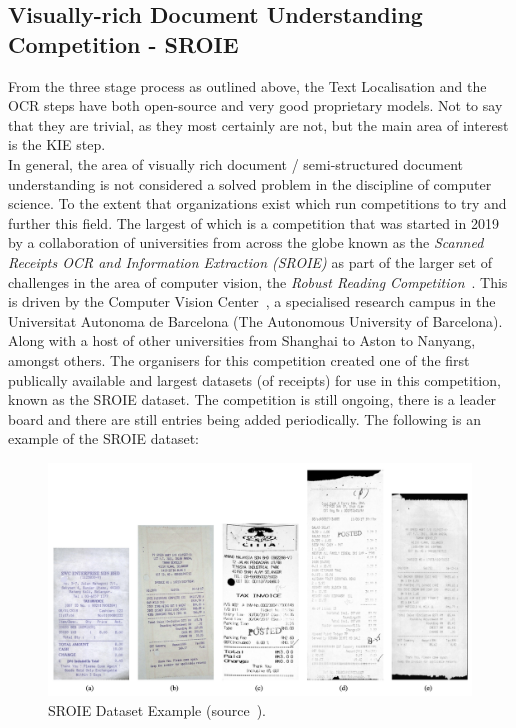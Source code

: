 \subsection{Visually-rich Document Understanding Competition - SROIE}
From the three stage process as outlined above, the Text Localisation and the OCR steps have both open-source and very good proprietary models.
Not to say that they are trivial, as they most certainly are not, but the main area of interest is the KIE step.\\
In general, the area of visually rich document / semi-structured document understanding is not considered a solved problem in the discipline of
computer science. To the extent that organizations exist which run competitions to try and further this field. The largest of which
is a competition that was started in 2019 by a collaboration of universities from across the globe known as the \emph{Scanned Receipts OCR
and Information Extraction (SROIE)} as part of the larger set of challenges in the area of computer vision, the 
\emph{Robust Reading Competition}~\autocite{OverviewICDAR2019}. 
This is driven by the Computer Vision Center~\autocite{ComputerVisionCenter}, a specialised research campus
in the Universitat Autonoma de Barcelona (The Autonomous University of Barcelona). Along with a host of other universities from Shanghai to
Aston to Nanyang, amongst others.
\bigbreak
The organisers for this competition created one of the first publically available and largest datasets
(of receipts) for use in this competition, known as the SROIE dataset. The competition is still ongoing, there is a leader board and there are still entries being added periodically.
The following is an example of the SROIE dataset:
\begin{figure}[H]
	\centering
	\includegraphics[width=1\textwidth]{figures/sroie_example.png}
	\caption{SROIE Dataset Example (source~\autocite{ResultsICDAR2019}).}
	\label{fig:sroie_dataset_example}
\end{figure}
